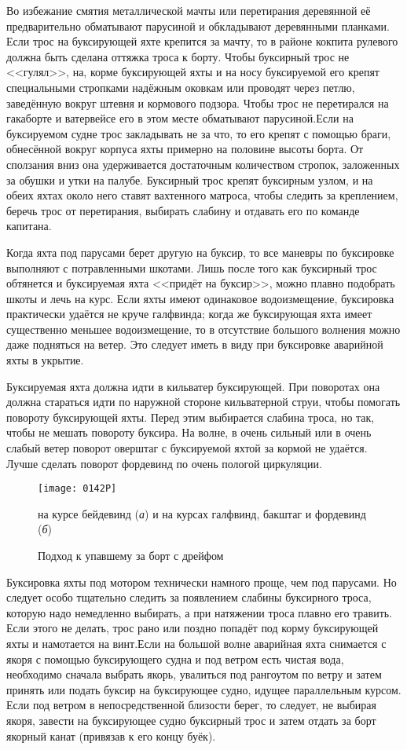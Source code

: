 Во избежание смятия металлической мачты или перетирания деревянной её
предварительно обматывают парусиной и обкладывают деревянными
планками. Если трос на буксирующей яхте крепится за мачту, то в районе
кокпита рулевого должна быть сделана оттяжка троса к борту. Чтобы
буксирный трос не <<гулял>>, на, корме буксирующей яхты и на носу
буксируемой его крепят специальными стропками надёжным оковкам или
проводят через петлю, заведённую вокруг штевня и кормового
подзора. Чтобы трос не перетирался на гакаборте и ватервейсе его в
этом месте обматывают парусиной.Если на буксируемом судне трос
закладывать не за что, то его крепят с помощью браги, обнесённой
вокруг корпуса яхты примерно на половине высоты борта. От сползания
вниз она удерживается достаточным количеством стропок, заложенных за
обушки и утки на палубе. Буксирный трос крепят буксирным узлом, и на
обеих яхтах около него ставят вахтенного матроса, чтобы следить за
креплением, беречь трос от перетирания, выбирать слабину и отдавать
его по команде капитана.

Когда яхта под парусами берет другую на буксир, то все маневры по
буксировке выполняют с потравленными шкотами. Лишь после того как
буксирный трос обтянется и буксируемая яхта <<придёт на буксир>>,
можно плавно подобрать шкоты и лечь на курс. Если яхты имеют
одинаковое водоизмещение, буксировка практически удаётся не круче
галфвинда; когда же буксирующая яхта имеет существенно меньшее
водоизмещение, то в отсутствие большого волнения можно даже подняться
на ветер. Это следует иметь в виду при буксировке аварийной яхты в
укрытие.

Буксируемая яхта должна идти в кильватер буксирующей. При поворотах
она должна стараться идти по наружной стороне кильватерной струи,
чтобы помогать повороту буксирующей яхты. Перед этим выбирается
слабина троса, но так, чтобы не мешать повороту буксира. На волне, в
очень сильный или в очень слабый ветер поворот оверштаг с буксируемой
яхтой за кормой не удаётся. Лучше сделать поворот фордевинд по очень
пологой циркуляции.

\begin{figure*}[htb]
  \centering{}
  \texttt{[image: 0142P]}
  \caption{Подход к упавшему за борт с дрейфом}
  \label{fig:142}
  \small
  \centering{}
  на курсе бейдевинд (\textit{а}) и на курсах галфвинд, бакштаг и фордевинд (\textit{б})
\end{figure*}

Буксировка яхты под мотором технически намного проще, чем под
парусами. Но следует особо тщательно следить за появлением слабины
буксирного троса, которую надо немедленно выбирать, а при натяжении
троса плавно его травить. Если этого не делать, трос рано или поздно
попадёт под корму буксирующей яхты и намотается на винт.Если на
большой волне аварийная яхта снимается с якоря с помощью буксирующего
судна и под ветром есть чистая вода, необходимо сначала выбрать якорь,
увалиться под рангоутом по ветру и затем принять или подать буксир на
буксирующее судно, идущее параллельным курсом. Если под ветром в
непосредственной близости берег, то следует, не выбирая якоря, завести
на буксирующее судно буксирный трос и затем отдать за борт якорный
канат (привязав к его концу буёк).

